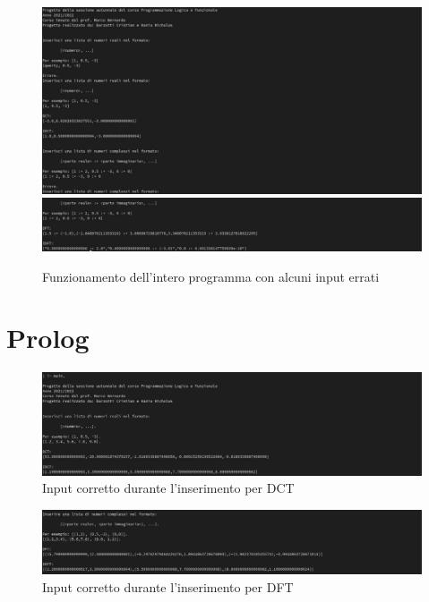 \documentclass{report}
\begin{document}
     \begin{center}
       \begin{figure}
         \includegraphics[width=\textwidth]{test_hs_10a.jpg}
         \includegraphics[width=\textwidth]{test_hs_10b.jpg}
         \caption{Funzionamento dell'intero programma con alcuni input errati}
       \end{figure}
     \end{center}


     \newpage
     \section{Prolog}
     \begin{center}
      \begin{figure}[h!]
        \includegraphics[width=\textwidth]{test_pl_1.jpg}
        \caption{Input corretto durante l'inserimento per DCT}
      \end{figure}
    \end{center}

    \begin{center}
      \begin{figure}[h!]
        \includegraphics[width=\textwidth]{test_pl_2.jpg}
        \caption{Input corretto durante l'inserimento per DFT}
      \end{figure}
    \end{center}
\end{document}
